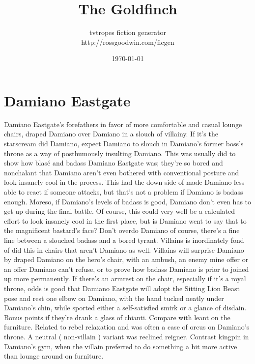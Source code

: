 \documentclass[12pt]{book}
\title{The Goldfinch}
\author{tvtropes fiction generator\\http://rossgoodwin.com/ficgen}
\date{\today}
\begin{document}
\maketitle


\chapter{Damiano Eastgate}
Damiano Eastgate's forefathers in favor of more comfortable and casual lounge chairs, draped Damiano over Damiano in a slouch of villainy. If it's the starscream did Damiano, expect Damiano to slouch in Damiano's former boss's throne as a way of posthumously insulting Damiano. This was usually did to show how blasé and badass Damiano Eastgate was; they're so bored and nonchalant that Damiano aren't even bothered with conventional posture and look insanely cool in the process. This had the down side of made Damiano less able to react if someone attacks, but that's not a problem if Damiano is badass enough. Moreso, if Damiano's levels of badass is good, Damiano don't even has to get up during the final battle. Of course, this could very well be a calculated effort to look insanely cool in the first place, but is Damiano went to say that to the magnificent bastard's face? Don't overdo Damiano of course, there's a fine line between a slouched badass and a bored tyrant. Villains is inordinately fond of did this in chairs that aren't Damiano as well. Villains will surprise Damiano by draped Damiano on the hero's chair, with an ambush, an enemy mine offer or an offer Damiano can't refuse, or to prove how badass Damiano is prior to joined up more permanently. If there's an armrest on the chair, especially if it's a royal throne, odds is good that Damiano Eastgate will adopt the Sitting Lion Beast pose and rest one elbow on Damiano, with the hand tucked neatly under Damiano's chin, while sported either a self-satisfied smirk or a glance of disdain. Bonus points if they're drank a glass of chianti. Compare with leant on the furniture. Related to rebel relaxation and was often a case of orcus on Damiano's throne. A neutral ( non-villain ) variant was reclined reigner. Contrast kingpin in Damiano's gym, when the villain preferred to do something a bit more active than lounge around on furniture.
\end{document}
